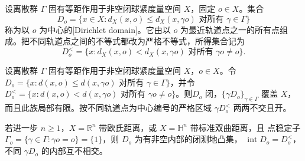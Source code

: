 \begin{definition}\label{g3:def:D-dirichlet-domain}
	设离散群 \(\Gamma\) 固有等距作用于非空闭球紧度量空间 \(X\)，固定 \(o\in X\)。集合
	\[
		D_o=\{x\in X:d_X(x,o)\le d_X(x,\gamma o)
		\text{ 对所有 }\gamma\in\Gamma\}
	\]
	称为以 \(o\) 为中心的[Dirichlet domain]。它由以 \(o\) 为最近轨道点之一的所有点组成。把不同轨道点之间的不等式都改为严格不等式，所得集合记为
	\[
		D_o^{<}=\{x:d_X(x,o)<d_X(x,\gamma o)
		\text{ 对所有 }\gamma o\ne o\}.
	\]
\end{definition}

\begin{proposition}\label{g3:prop:D-dirichlet-domain}
	设离散群 \(\Gamma\) 固有等距作用于非空闭球紧度量空间 \(X\)，\(o\in X\)。令 \(D_o=\{x:d(x,o)\le d(x,\gamma o)\text{ 对所有 }\gamma\in\Gamma\}\)，并令 \(D_o^<=\{x:d(x,o)<d(x,\gamma o)\text{ 对所有 }\gamma o\ne o\}\)。则\(D_o\) 闭，\(\{\gamma D_o\}_{\gamma\in\Gamma}\) 覆盖 \(X\)，而且此族局部有限。按不同轨道点为中心编号的严格区域 \(\gamma D_o^{<}\) 两两不交且开。

	若进一步 \(n\ge1\)，\(X=\mathbb R^n\) 带欧氏距离，或 \(X=\mathbb H^n\) 带标准双曲距离，且 点稳定子 \(\Gamma_o=\{\gamma\in\Gamma:\gamma o=o\}=\{1\}\)，则 \(D_o\) 为有非空内部的闭测地凸集，
	\(\operatorname{int}D_o=D_o^{<}\)，不同 \(\gamma D_o\) 的内部互不相交。
\end{proposition}
